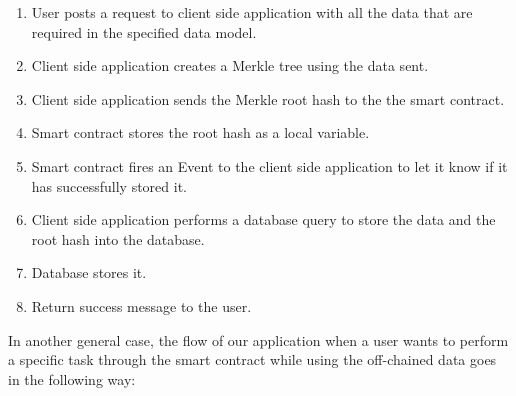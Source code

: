 \begin{enumerate}
	\item User posts a request to client side application with all the data that are required in the specified data model. 
	\item Client side application creates a Merkle tree using the data sent.
	\item Client side application sends the Merkle root hash to the the smart contract.
	\item Smart contract stores the root hash as a local variable.
	\item Smart contract fires an Event to the client side application to let it know if it has successfully stored it. 
	\item Client side application performs a database query to store the data and the root hash into the database.
	\item Database stores it.
	\item Return success message to the user. 
\end{enumerate}

In another general case, the flow of our application when a user wants to perform a specific task through the smart contract while using the off-chained data goes in the following way:

